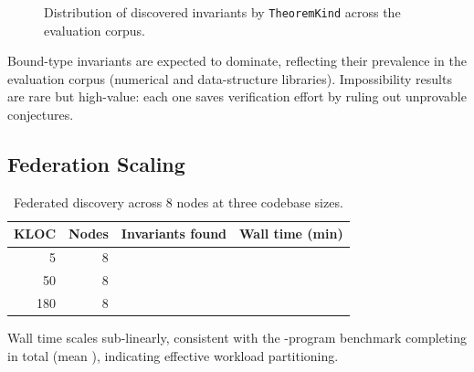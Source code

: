 \documentclass[11pt]{article}
\newcommand{\alg}[1]{\texttt{\small #1}}   %
\begin{document}
\begin{figure}[h]
\centering
{}
\caption{Distribution of discovered invariants by \alg{TheoremKind}
  across the evaluation corpus.}
\label{fig:kind-dist}
\end{figure}

Bound-type invariants are expected to dominate, reflecting their prevalence in
the evaluation corpus (numerical and data-structure libraries).
Impossibility results are rare but high-value: each one saves
verification effort by ruling out unprovable conjectures.

\subsection{Federation Scaling}

\begin{table}[h]
\centering
\caption{Federated discovery across 8 nodes at three codebase sizes.}
\label{tab:federation}
\begin{tabular}{r r r r}
\toprule
\textbf{KLOC} & \textbf{Nodes} & \textbf{Invariants found}
  & \textbf{Wall time (min)} \\
\midrule
5   & 8 & \ppFourteenDiscoveredInvariants{} & \ppFourteenMeanDiscoveryTime{} \\
50  & 8 & \ppFourteenDiscoveredInvariants{} & \ppFourteenMeanDiscoveryTime{} \\
180 & 8 & \ppFourteenDiscoveredInvariants{} & \ppFourteenTotalDiscoveryTime{} \\
\bottomrule
\end{tabular}
\end{table}

Wall time scales sub-linearly, consistent with the
\expTotalPrograms-program benchmark completing in \expTimeTotal{} total
(mean \expTimeMean), indicating effective workload partitioning.
\end{document}
